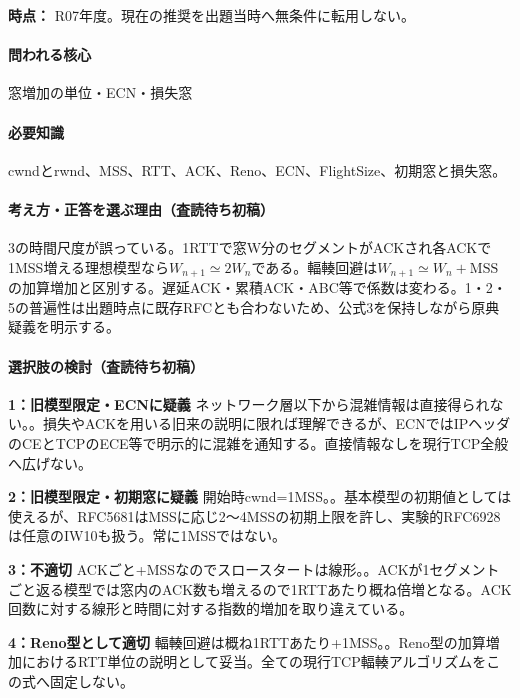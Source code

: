 \noindent\textbf{時点：} R07年度。現在の推奨を出題当時へ無条件に転用しない。\par

\paragraph{問われる核心} 窓増加の単位・ECN・損失窓

\paragraph{必要知識} cwndとrwnd、MSS、RTT、ACK、Reno、ECN、FlightSize、初期窓と損失窓。

\paragraph{考え方・正答を選ぶ理由（査読待ち初稿）} 3の時間尺度が誤っている。1RTTで窓W分のセグメントがACKされ各ACKで1MSS増える理想模型なら\(W_{n+1}\simeq2W_n\)である。輻輳回避は\(W_{n+1}\simeq W_n+\mathrm{MSS}\)の加算増加と区別する。遅延ACK・累積ACK・ABC等で係数は変わる。1・2・5の普遍性は出題時点に既存RFCとも合わないため、公式3を保持しながら原典疑義を明示する。

\paragraph{選択肢の検討（査読待ち初稿）}\mbox{}\par

\noindent\textbf{1：旧模型限定・ECNに疑義} ネットワーク層以下から混雑情報は直接得られない。。損失やACKを用いる旧来の説明に限れば理解できるが、ECNではIPヘッダのCEとTCPのECE等で明示的に混雑を通知する。直接情報なしを現行TCP全般へ広げない。\par

\noindent\textbf{2：旧模型限定・初期窓に疑義} 開始時cwnd=\allowbreak{}1MSS。。基本模型の初期値としては使えるが、RFC5681はMSSに応じ2〜4MSSの初期上限を許し、実験的RFC6928は任意のIW10も扱う。常に1MSSではない。\par

\noindent\textbf{3：不適切} ACKごと+MSSなのでスロースタートは線形。。ACKが1セグメントごと返る模型では窓内のACK数も増えるので1RTTあたり概ね倍増となる。ACK回数に対する線形と時間に対する指数的増加を取り違えている。\par

\noindent\textbf{4：Reno型として適切} 輻輳回避は概ね1RTTあたり+1MSS。。Reno型の加算増加におけるRTT単位の説明として妥当。全ての現行TCP輻輳アルゴリズムをこの式へ固定しない。\par

